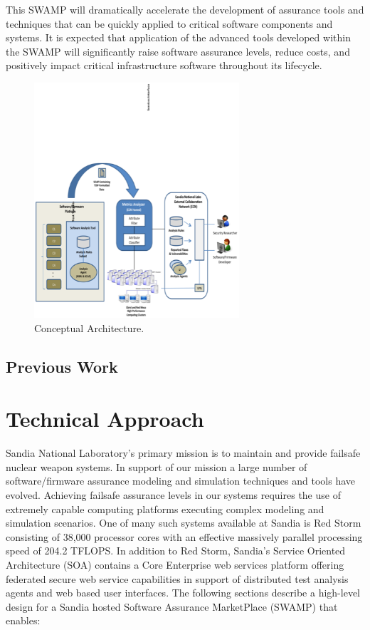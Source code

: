 \documentclass[times, 10pt,twocolumn]{article}
\begin{document}
This SWAMP will dramatically accelerate the development of assurance tools and techniques that can be quickly applied to critical software components and systems. It is expected that application of the advanced tools developed within the SWAMP will significantly raise software assurance levels, reduce costs, and positively impact critical infrastructure software throughout its lifecycle.

\begin{figure}[!t]
\centering
\includegraphics[width=3in]{image001}
\caption{Conceptual Architecture.}
\label{fig:con-arch}
\end{figure}  

\subsection{Previous Work}


\section{Technical Approach}\label{sec:tech}
Sandia National Laboratory’s primary mission is to maintain and provide failsafe nuclear weapon systems. In support of our mission a large number of software/firmware assurance modeling and simulation techniques and tools have evolved. Achieving failsafe assurance levels in our systems requires the use of extremely capable computing platforms executing complex modeling and simulation scenarios. One of many such systems available at Sandia is Red Storm consisting of 38,000 processor cores with an effective massively parallel processing speed of 204.2 TFLOPS. In addition to Red Storm, Sandia’s Service Oriented Architecture (SOA) contains a Core Enterprise web services platform offering federated secure web service capabilities in support of distributed test analysis agents and web based user interfaces. The following sections describe a high-level design for a Sandia hosted Software Assurance MarketPlace (SWAMP) that enables:
\end{document}

